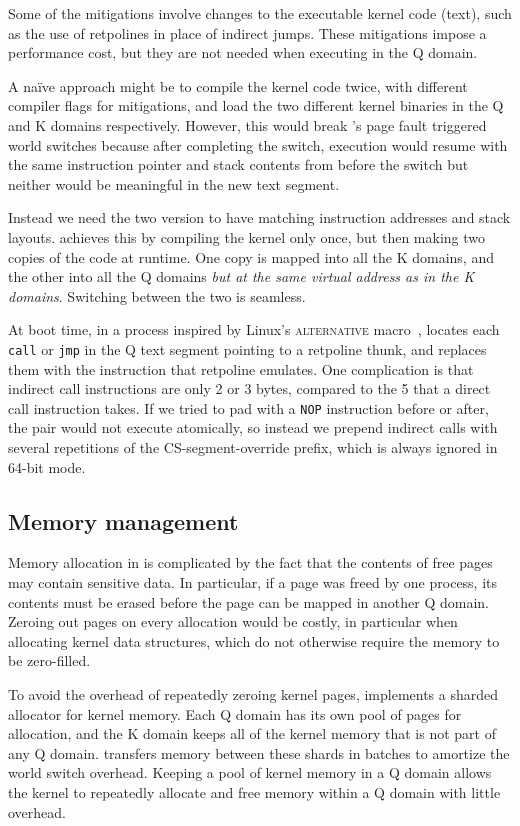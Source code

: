 Some of the mitigations involve changes to the executable kernel code
(text), such as the use of retpolines in place of indirect jumps.
These mitigations impose a performance cost, but they are not needed
when executing in the Q domain.

A na\"ive approach might be to compile the kernel code twice, with
different compiler flags for mitigations, and load the two different kernel
binaries in the Q and K domains respectively. However, this would break \sys's
page fault triggered world switches because after completing the switch,
execution would resume with the same instruction pointer and stack contents
from before the switch but neither would be meaningful in the new text
segment.

Instead we need the two version to have matching instruction addresses and stack
layouts. \sys achieves this by compiling the kernel only once, but then making
two copies of the code at runtime. One copy is mapped into all the K domains,
and the other into all the Q domains \textit{but at the same virtual address
as in the K domains}. Switching between the two is seamless.

At boot time, in a process inspired by Linux's \textsc{alternative}
macro~\cite{lwn:alternative}, \sys locates each \texttt{call} or
\texttt{jmp} in the Q text segment pointing to a retpoline thunk, and
replaces them with the instruction that retpoline emulates. One
complication is that indirect call instructions are only 2 or 3 bytes,
compared to the 5 that a direct call instruction takes. If we tried
to pad with a \texttt{NOP} instruction before or after, the pair would not execute
atomically, so instead we prepend indirect calls with several
repetitions of the CS-segment-override prefix, which is always ignored
in 64-bit mode.


\subsection*{Memory management}
\label{ss:mm}

Memory allocation in \sys is complicated by the fact that the contents
of free pages may contain sensitive data.  In particular, if a page was
freed by one process, its contents must be erased before the page can
be mapped in another Q domain.  Zeroing out pages on every allocation
would be costly, in particular when allocating kernel data structures,
which do not otherwise require the memory to be zero-filled.

To avoid the overhead of repeatedly zeroing kernel pages, \sys implements
a sharded allocator for kernel memory.  Each Q domain has its own pool
of pages for allocation, and the K domain keeps all of the kernel memory
that is not part of any Q domain.  \sys transfers memory between these
shards in batches to amortize the world switch overhead.  Keeping a pool
of kernel memory in a Q domain allows the kernel to repeatedly allocate
and free memory within a Q domain with little overhead.

